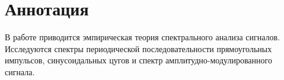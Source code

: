 \section*{Аннотация}

В работе приводится эмпирическая теория спектрального анализа сигналов. Исследуются спектры периодической последовательности прямоугольных импульсов, синусоидальных цугов и спектр амплитудно-модулированного сигнала.